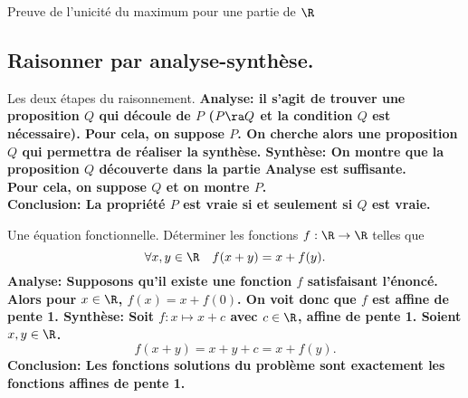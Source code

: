 \documentclass[11pt]{article}
\begin{document}
\begin{ex}{}{}
    Preuve de l'unicité du maximum pour une partie de $\R$
\end{ex}

\subsection{Raisonner par analyse-synthèse.}

\begin{meth}{Les deux étapes du raisonnement.}{}
    \bf{Analyse:} il s'agit de trouver une proposition $Q$ qui découle de $P$ ($P\ra Q$ et la condition $Q$ est nécessaire). Pour cela, on suppose $P$. On cherche alors une proposition $Q$ qui permettra de réaliser la synthèse.\n
    \bf{Synthèse:} On montre que la proposition $Q$ découverte dans la partie Analyse est suffisante.\\
    Pour cela, on suppose $Q$ et on montre $P$.\\
    \bf{Conclusion:} La propriété $P$ est vraie si et seulement si $Q$ est vraie.
\end{meth}

\begin{ex}{Une équation fonctionnelle.}{}
    Déterminer les fonctions $f:\R\to\R$ telles que
    \begin{equation*}
        \forall x,y\in \R \quad f(x+y) = x+f(y).
    \end{equation*}
    \tcblower
    \bf{Analyse:} Supposons qu'il existe une fonction $f$ satisfaisant l'énoncé. Alors pour $x\in\R$, $f(x)=x+f(0)$. On voit donc que $f$ est affine de pente 1.\n
    \bf{Synthèse:} Soit $f:x\mapsto x+c$ avec $c\in \R$, affine de pente 1. Soient $x,y\in\R$.
    \begin{equation*}
        f(x+y)=x+y+c=x+f(y).
    \end{equation*}
    \bf{Conclusion:} Les fonctions solutions du problème sont exactement les fonctions affines de pente 1.
\end{ex}
\end{document}
